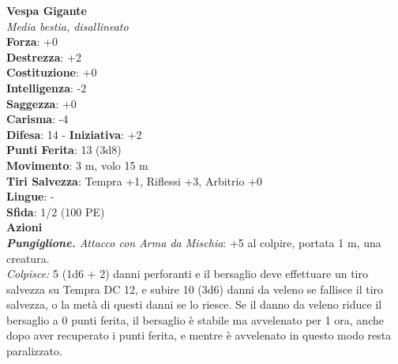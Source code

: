 \begin{multicols}{2}
\medskip\textbf{Vespa Gigante}\\
\emph{Media bestia, disallineato}\\
\textbf{Forza}: +0\\
\textbf{Destrezza}: +2\\
\textbf{Costituzione}: +0\\
\textbf{Intelligenza}: -2\\
\textbf{Saggezza}: +0\\
\textbf{Carisma}: -4\\
\textbf{Difesa}: 14 - \textbf{Iniziativa}: +2\\
\textbf{Punti Ferita}: 13 (3d8)\\
\textbf{Movimento}: 3 m, volo 15 m\\
\textbf{Tiri Salvezza}: Tempra +1, Riflessi +3, Arbitrio +0 \\
\textbf{Lingue}: -\\
\textbf{Sfida}: 1/2 (100 PE)\smallskip\\
\smallskip\textbf{Azioni}\\
\emph{\textbf{Pungiglione.} Attacco con Arma da Mischia}: +5 al colpire, portata 1 m, una creatura.\\
\emph{Colpisce:} 5 (1d6 + 2) danni perforanti e il bersaglio deve effettuare un tiro salvezza su Tempra DC  12, e subire 10 (3d6) danni da veleno se fallisce il tiro salvezza, o la metà di questi danni se lo riesce. Se il danno da veleno riduce il bersaglio a 0 punti ferita, il bersaglio è stabile ma avvelenato per 1 ora, anche dopo aver recuperato i punti ferita, e mentre è avvelenato in questo modo resta paralizzato.\\


\end{multicols}
